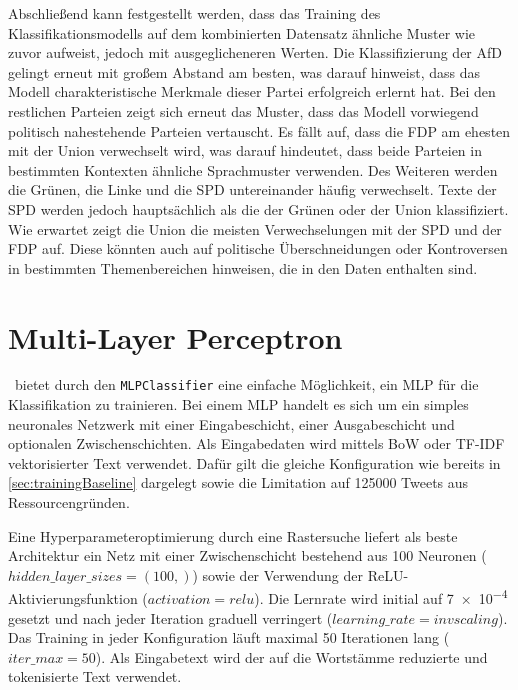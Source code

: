 Abschließend kann festgestellt werden, dass das Training des Klassifikationsmodells auf dem kombinierten Datensatz ähnliche Muster wie zuvor aufweist, jedoch mit ausgeglicheneren Werten. Die Klassifizierung der \ac{AfD} gelingt erneut mit großem Abstand am besten, was darauf hinweist, dass das Modell charakteristische Merkmale dieser Partei erfolgreich erlernt hat. Bei den restlichen Parteien zeigt sich erneut das Muster, dass das Modell vorwiegend politisch nahestehende Parteien vertauscht. Es fällt auf, dass die \ac{FDP} am ehesten mit der Union verwechselt wird, was darauf hindeutet, dass beide Parteien in bestimmten Kontexten ähnliche Sprachmuster verwenden. Des Weiteren werden die Grünen, die Linke und die \ac{SPD} untereinander häufig verwechselt. Texte der \ac{SPD} werden jedoch hauptsächlich als die der Grünen oder der Union klassifiziert. Wie erwartet zeigt die Union die meisten Verwechselungen mit der \ac{SPD} und der \ac{FDP} auf. Diese könnten auch auf politische Überschneidungen oder Kontroversen in bestimmten Themenbereichen hinweisen, die in den Daten enthalten sind.

\section{Multi-Layer Perceptron}

\sk~bietet durch den \texttt{MLPClassifier} eine einfache Möglichkeit, ein \ac{MLP} für die Klassifikation zu trainieren. Bei einem \ac{MLP} handelt es sich um ein simples neuronales Netzwerk mit einer Eingabeschicht, einer Ausgabeschicht und optionalen Zwischenschichten. Als Eingabedaten wird mittels \ac{BoW} oder \ac{TF-IDF} vektorisierter Text verwendet. Dafür gilt die gleiche Konfiguration wie bereits in \autoref{sec:trainingBaseline} dargelegt sowie die Limitation auf \num{125000} Tweets aus Ressourcengründen.

Eine Hyperparameteroptimierung durch eine Rastersuche liefert als beste Architektur ein Netz mit einer Zwischenschicht bestehend aus \num{100} Neuronen (\(hidden\_layer\_sizes=(\num{100},)\)) sowie der Verwendung der \ac{ReLU}-Aktivierungsfunktion (\(activation=relu\)). Die Lernrate wird initial auf \num{7e-4} gesetzt und nach jeder Iteration graduell verringert (\(learning\_rate=invscaling\)). Das Training in jeder Konfiguration läuft maximal \num{50} Iterationen lang (\(iter\_max=\num{50}\)). Als Eingabetext wird der auf die Wortstämme reduzierte und tokenisierte Text verwendet.

